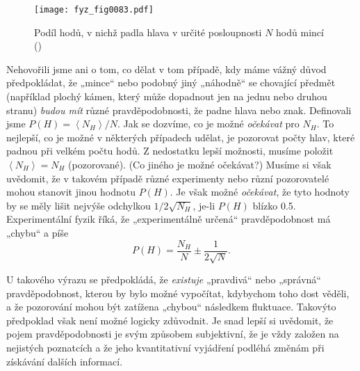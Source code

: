     \begin{figure}[ht!]  %
      \centering
      \texttt{[image: fyz\_fig0083.pdf]}
      \caption{Podíl hodů, v nichž padla hlava v určité posloupnosti \(N\) hodů mincí  
               (\cite[s.~85]{Feynman01})}
      \label{fyz:fig0083}
    \end{figure}
    
    Nehovořili jsme ani o tom, co dělat v tom případě, kdy máme vážný důvod předpokládat, že 
    „mince“ nebo podobný jiný „náhodně“ se chovající předmět (například plochý kámen, který může 
    dopadnout jen na jednu nebo druhou stranu) \emph{budou mít} různé pravděpodobnosti, že padne 
    hlava nebo znak. Definovali jsme \(P(H) =\left\langle N_H\right\rangle/N\). Jak se dozvíme, co 
    je možné \emph{očekávat} pro \(N_H\). To nejlepší, co je možné v některých případech udělat, je 
    pozorovat počty hlav, které padnou při velkém počtu hodů. Z nedostatku lepší možnosti, musíme 
    položit \(\left\langle N_H\right\rangle = N_H\) (pozorované). (Co jiného je možné očekávat?) 
    Musíme si však uvědomit, že v takovém případě různé experimenty nebo různí pozorovatelé mohou 
    stanovit jinou hodnotu \(P(H)\). Je však možné \emph{očekávat}, že tyto hodnoty by se měly 
    lišit nejvýše odchylkou \(1/2\sqrt{N_H}\), je-li \(P(H)\) blízko \num{0.5}. Experimentální 
    fyzik říká, že „experimentálně určená“ pravděpodobnost má „chybu“ a píše
    \begin{equation}\label{fyz:eq085}
      P(H) = \frac{N_H}{N}\pm\frac{1}{2\sqrt{N}}.
    \end{equation}
    
    U takového výrazu se předpokládá, že \emph{existuje} „pravdivá“ nebo „správná“ pravděpodobnost, 
    kterou by bylo možné vypočítat, kdybychom toho dost věděli, a že pozorování mohou být zatížena 
    „chybou“ následkem fluktuace. Takovýto předpoklad však není možné logicky zdůvodnit. Je snad 
    lepší si uvědomit, že pojem pravděpodobnosti je svým způsobem subjektivní, že je vždy založen 
    na nejistých poznatcích a že jeho kvantitativní vyjádření podléhá změnám při získávání dalších 
    informací.
        
